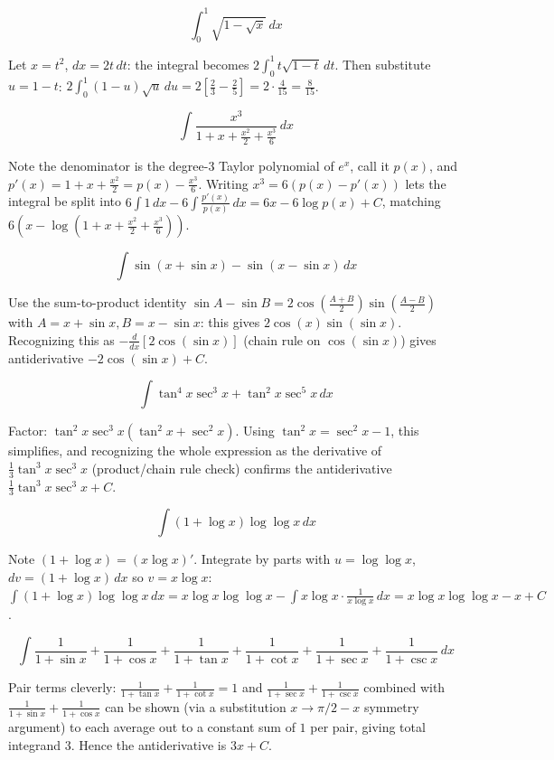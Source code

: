 \begin{questions}
\question
\[\int_0^1 \sqrt{1-\sqrt x}\,dx\]
\begin{solution}
Let $x=t^2$, $dx=2t\,dt$: the integral becomes $2\int_0^1 t\sqrt{1-t}\,dt$. Then substitute $u=1-t$: $2\int_0^1(1-u)\sqrt u\,du = 2\left[\frac23-\frac25\right]=2\cdot\frac{4}{15}=\frac{8}{15}$.
\end{solution}

\question
\[\int \frac{x^3}{1+x+\frac{x^2}{2}+\frac{x^3}{6}}\,dx\]
\begin{solution}
Note the denominator is the degree-3 Taylor polynomial of $e^x$, call it $p(x)$, and $p'(x) = 1+x+\frac{x^2}{2}=p(x)-\frac{x^3}{6}$. Writing $x^3 = 6(p(x)-p'(x))$ lets the integral be split into $6\int 1\,dx - 6\int\frac{p'(x)}{p(x)}\,dx = 6x-6\log p(x)+C$, matching $6\left(x-\log(1+x+\frac{x^2}2+\frac{x^3}6)\right)$.
\end{solution}

\question
\[\int \sin(x+\sin x)-\sin(x-\sin x)\,dx\]
\begin{solution}
Use the sum-to-product identity $\sin A-\sin B = 2\cos\left(\frac{A+B}2\right)\sin\left(\frac{A-B}2\right)$ with $A=x+\sin x,B=x-\sin x$: this gives $2\cos(x)\sin(\sin x)$. Recognizing this as $-\frac{d}{dx}\left[2\cos(\sin x)\right]$ (chain rule on $\cos(\sin x)$) gives antiderivative $-2\cos(\sin x)+C$.
\end{solution}

\question
\[\int \tan^4x\sec^3x+\tan^2x\sec^5x\,dx\]
\begin{solution}
Factor: $\tan^2x\sec^3x(\tan^2x+\sec^2x)$. Using $\tan^2x=\sec^2x-1$, this simplifies, and recognizing the whole expression as the derivative of $\frac13\tan^3x\sec^3x$ (product/chain rule check) confirms the antiderivative $\frac13\tan^3x\sec^3x+C$.
\end{solution}

\question
\[\int (1+\log x)\log\log x\,dx\]
\begin{solution}
Note $(1+\log x) = (x\log x)'$. Integrate by parts with $u=\log\log x$, $dv=(1+\log x)\,dx$ so $v=x\log x$: $\int (1+\log x)\log\log x\,dx = x\log x\log\log x - \int x\log x\cdot\frac{1}{x\log x}\,dx = x\log x\log\log x - x + C$.
\end{solution}

\question
\[\int \frac{1}{1+\sin x}+\frac{1}{1+\cos x}+\frac{1}{1+\tan x}+\frac{1}{1+\cot x}+\frac{1}{1+\sec x}+\frac{1}{1+\csc x}\,dx\]
\begin{solution}
Pair terms cleverly: $\frac{1}{1+\tan x}+\frac{1}{1+\cot x}=1$ and $\frac{1}{1+\sec x}+\frac{1}{1+\csc x}$ combined with $\frac{1}{1+\sin x}+\frac1{1+\cos x}$ can be shown (via a substitution $x\to \pi/2-x$ symmetry argument) to each average out to a constant sum of $1$ per pair, giving total integrand $3$. Hence the antiderivative is $3x+C$.
\end{solution}


\end{questions}
